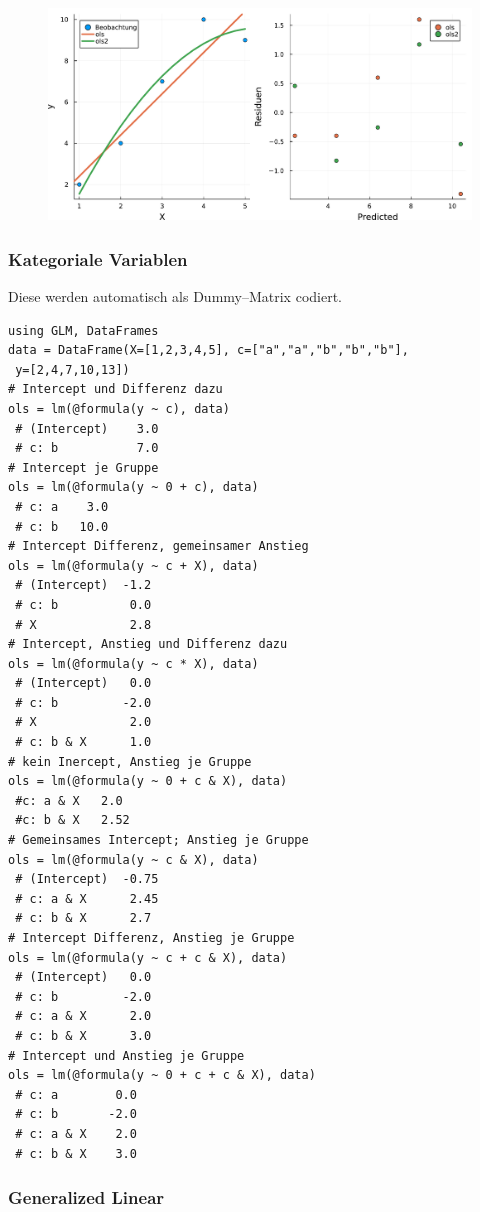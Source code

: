 \documentclass[10pt,twocolumn]{scrartcl}
\begin{document}
\begin{figure}[ht]
  \centering
  \includegraphics[width=.95\columnwidth]{glm.pdf}
\end{figure}

\subsubsection{Kategoriale Variablen}
\label{ssec:kategorialeVariablen}

Diese werden automatisch als Dummy--Matrix codiert.

\begin{lstlisting}
using GLM, DataFrames
data = DataFrame(X=[1,2,3,4,5], c=["a","a","b","b","b"],
 y=[2,4,7,10,13])
# Intercept und Differenz dazu
ols = lm(@formula(y ~ c), data)
 # (Intercept)    3.0
 # c: b           7.0
# Intercept je Gruppe
ols = lm(@formula(y ~ 0 + c), data)
 # c: a    3.0
 # c: b   10.0
# Intercept Differenz, gemeinsamer Anstieg
ols = lm(@formula(y ~ c + X), data)
 # (Intercept)  -1.2
 # c: b          0.0
 # X             2.8
# Intercept, Anstieg und Differenz dazu
ols = lm(@formula(y ~ c * X), data)
 # (Intercept)   0.0
 # c: b         -2.0
 # X             2.0
 # c: b & X      1.0
# kein Inercept, Anstieg je Gruppe
ols = lm(@formula(y ~ 0 + c & X), data)
 #c: a & X   2.0
 #c: b & X   2.52
# Gemeinsames Intercept; Anstieg je Gruppe
ols = lm(@formula(y ~ c & X), data)
 # (Intercept)  -0.75
 # c: a & X      2.45
 # c: b & X      2.7
# Intercept Differenz, Anstieg je Gruppe
ols = lm(@formula(y ~ c + c & X), data)
 # (Intercept)   0.0
 # c: b         -2.0
 # c: a & X      2.0
 # c: b & X      3.0
# Intercept und Anstieg je Gruppe
ols = lm(@formula(y ~ 0 + c + c & X), data)
 # c: a        0.0
 # c: b       -2.0
 # c: a & X    2.0
 # c: b & X    3.0
\end{lstlisting}

\subsubsection{Generalized Linear}
\end{document}
